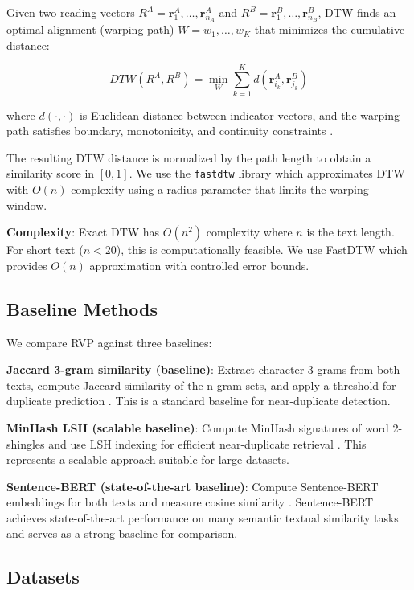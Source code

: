 \documentclass[11pt,letterpaper]{article}
\begin{document}
Given two reading vectors $R^A = \mathbf{r}_1^A, \ldots, \mathbf{r}_{n_A}^A$ and $R^B = \mathbf{r}_1^B, \ldots, \mathbf{r}_{n_B}^B$, DTW finds an optimal alignment (warping path) $W = w_1, \ldots, w_K$ that minimizes the cumulative distance:

$$DTW(R^A, R^B) = \min_W \sum_{k=1}^K d(\mathbf{r}_{i_k}^A, \mathbf{r}_{j_k}^B)$$

where $d(\cdot, \cdot)$ is Euclidean distance between indicator vectors, and the warping path satisfies boundary, monotonicity, and continuity constraints \cite{Sakoe1978}.

The resulting DTW distance is normalized by the path length to obtain a similarity score in $[0, 1]$. We use the \texttt{fastdtw} library \cite{Salvador2007} which approximates DTW with $O(n)$ complexity using a radius parameter that limits the warping window.

\textbf{Complexity}: Exact DTW has $O(n^2)$ complexity where $n$ is the text length. For short text ($n < 20$), this is computationally feasible. We use FastDTW \cite{Salvador2007} which provides $O(n)$ approximation with controlled error bounds.

\subsection{Baseline Methods}

We compare RVP against three baselines:

\textbf{Jaccard 3-gram similarity (baseline)}: Extract character 3-grams from both texts, compute Jaccard similarity of the n-gram sets, and apply a threshold for duplicate prediction \cite{Ukkonen1992}. This is a standard baseline for near-duplicate detection.

\textbf{MinHash LSH (scalable baseline)}: Compute MinHash signatures of word 2-shingles and use LSH indexing for efficient near-duplicate retrieval \cite{Manku2007}. This represents a scalable approach suitable for large datasets.

\textbf{Sentence-BERT (state-of-the-art baseline)}: Compute Sentence-BERT embeddings for both texts and measure cosine similarity \cite{Reimers2019}. Sentence-BERT achieves state-of-the-art performance on many semantic textual similarity tasks and serves as a strong baseline for comparison.

\subsection{Datasets}
\end{document}
